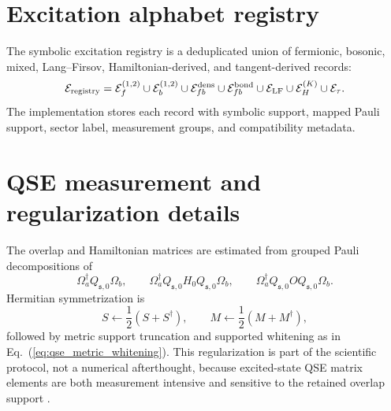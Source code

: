\documentclass[
  reprint,
  amsmath,
  amssymb,
  aps,
  pra,
  nofootinbib,
  superscriptaddress,
  floatfix
]{revtex4-2}
\newcommand{\Ecal}{\mathcal{E}}
\newcommand{\lf}{\mathrm{LF}}
\begin{document}
\section{Excitation alphabet registry}
\label{app:excitation_alphabets}

The symbolic excitation registry is a deduplicated union of fermionic, bosonic, mixed, Lang--Firsov, Hamiltonian-derived, and tangent-derived records:
\begin{equation}
\Ecal_{\rm registry}
=
\Ecal_f^{(1,2)}
\cup
\Ecal_b^{(1,2)}
\cup
\Ecal_{fb}^{\rm dens}
\cup
\Ecal_{fb}^{\rm bond}
\cup
\Ecal_{\lf}
\cup
\Ecal_H^{(K)}
\cup
\Ecal_\tau .
\label{eq:app_excitation_registry}
\end{equation}
The implementation stores each record with symbolic support, mapped Pauli support, sector label, measurement groups, and compatibility metadata.

\section{QSE measurement and regularization details}
\label{app:qse_measurement_details}

The overlap and Hamiltonian matrices are estimated from grouped Pauli decompositions of
\begin{equation}
\Omega_a^\dagger Q_{\mathfrak s,0}\Omega_b,
\qquad
\Omega_a^\dagger Q_{\mathfrak s,0}H_0Q_{\mathfrak s,0}\Omega_b,
\qquad
\Omega_a^\dagger Q_{\mathfrak s,0}OQ_{\mathfrak s,0}\Omega_b.
\label{eq:app_qse_measurement_operators}
\end{equation}
Hermitian symmetrization is
\begin{equation}
S\leftarrow\frac12(S+S^\dagger),\qquad
M\leftarrow\frac12(M+M^\dagger),
\label{eq:app_qse_symmetrization}
\end{equation}
followed by metric support truncation and supported whitening as in Eq.~(\ref{eq:qse_metric_whitening}).  This regularization is part of the scientific protocol, not a numerical afterthought, because excited-state QSE matrix elements are both measurement intensive and sensitive to the retained overlap support \cite{ChoiIzmaylov2023MeasurementQSE,Nakamura2024AdaptiveMeasurementQSE,Kwao2026GEPQSE}.
\end{document}
